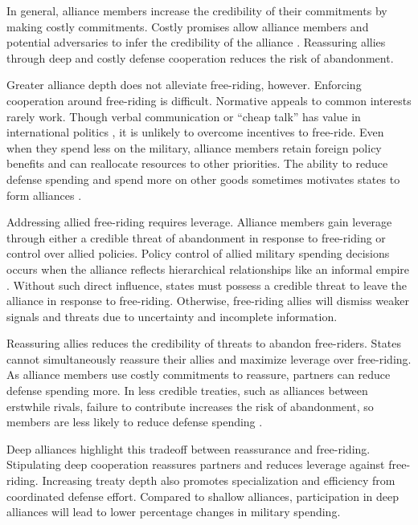 \documentclass[12pt]{article}
\begin{document}
In general, alliance members increase the credibility of their commitments by making costly commitments. 
Costly promises allow alliance members and potential adversaries to infer the credibility of the alliance \citep{Leeds2003, FuhrmannSechser2014}. 
Reassuring allies through deep and costly defense cooperation reduces the risk of abandonment.


Greater alliance depth does not alleviate free-riding, however. 
Enforcing cooperation around free-riding is difficult.
Normative appeals to common interests rarely work. 
Though verbal communication or ``cheap talk'' has value in international politics \citep{Trager2010}, it is unlikely to overcome incentives to free-ride. 
Even when they spend less on the military, alliance members retain foreign policy benefits and can reallocate resources to other priorities. 
The ability to reduce defense spending and spend more on other goods sometimes motivates states to form alliances \citep{Kimball2010, AllenDigiuseppe2013}. 


Addressing allied free-riding requires leverage. 
Alliance members gain leverage through either a credible threat of abandonment in response to free-riding or control over allied policies. 
Policy control of allied military spending decisions occurs when the alliance reflects hierarchical relationships like an informal empire \citep{Lake1996}. 
Without such direct influence, states must possess a credible threat to leave the alliance in response to free-riding. 
Otherwise, free-riding allies will dismiss weaker signals and threats due to uncertainty and incomplete information. 


Reassuring allies reduces the credibility of threats to abandon free-riders. 
States cannot simultaneously reassure their allies and maximize leverage over free-riding. 
As alliance members use costly commitments to reassure, partners can reduce defense spending more. 
In less credible treaties, such as alliances between erstwhile rivals, failure to contribute increases the risk of abandonment, so members are less likely to reduce defense spending \citep{NiouZeigler2019}. 


Deep alliances highlight this tradeoff between reassurance and free-riding. 
Stipulating deep cooperation reassures partners and reduces leverage against free-riding. 
Increasing treaty depth also promotes specialization and efficiency from coordinated defense effort.
Compared to shallow alliances, participation in deep alliances will lead to lower percentage changes in military spending. 
\end{document}
